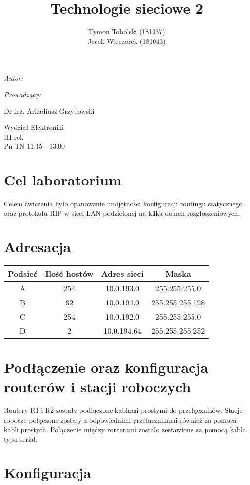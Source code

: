 \documentclass[wide,a4paper,titlepage,12pt] {article}
\title{Technologie sieciowe 2}
\author{Tymon Tobolski (181037)\\ Jacek Wieczorek (181043)}
\makeatletter
\renewcommand{\maketitle}{
\begin{titlepage}
  \begin{center}
    \vspace*{3cm}
    \LARGE \@title \par
    \vspace{2cm}
    \textit{\small Autor:}\par
    \normalsize \@author\par \normalsize
    \vspace{3cm}
    \textit{\small Prowadzący:}\par
    Dr inż. Arkadiusz Grzybowski\par
    \vspace{2cm}
    Wydział Elektroniki\\ III rok\\ Pn TN 11.15 - 13.00\par
    \vspace{4cm}
    \small \@date
  \end{center}
\end{titlepage}
}
\makeatother
\begin{document}
\maketitle
  \section{Cel laboratorium}
  \paragraph{}
  Celem ćwiczenia było opanowanie umijętności konfiguracji routingu statycznego oraz protokołu RIP w sieci LAN podzielonej na kilka domen rozgłoszeniowych.

  \section{Adresacja}

  \begin{center}
    \begin{tabular}{|c|c|c|c|}
      \hline
      Podsieć & Ilość hostów & Adres sieci & Maska \\
      \hline
      A & 254 & 10.0.193.0  & 255.255.255.0 \\
      B & 62  & 10.0.194.0  & 255.255.255.128 \\
      C & 254 & 10.0.192.0  & 255.255.255.0 \\
      D & 2   & 10.0.194.64 & 255.255.255.252 \\
      \hline
    \end{tabular}
  \end{center}

  \section{Podłączenie oraz konfiguracja routerów i stacji roboczych}
  \paragraph{}
  Routery R1 i R2 zostały podłączone kablami prostymi do przełączników. Stacje robocze połączone zostały z odpowiednimi przełącznikami również za pomoca kabli prostych. Połączenie między routerami zostało zestawione za pomocą kabla typu serial.

  \section{Konfiguracja}
\end{document}

